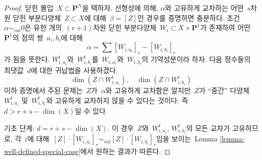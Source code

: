 \begin{proof}
닫힌 몰입\  $X \subset \mathbf{P}^N$을 택하자.
선형성에 의해, $\alpha$와 고유하게 교차하는 어떤\ 
$s$차원 닫힌 부분다양체\  $Z \subset X$에 대해\ 
$\beta = [Z]$인 경우를 증명하면 충분하다.
조건\  $\alpha \sim_{rat} 0$은 유한 개의\  $(r + 1)$차원 닫힌 부분다양체\ 
$W_i \subset X \times \mathbf{P}^1$가 존재하여
어떤\  $\mathbf{P}^1$의 점의 쌍\  $a_i, b_i$에 대해
$$
\alpha = \sum [W_{i, a_i}]_r - [W_{i, b_i}]_r
$$
가 됨을 뜻한다. $W_{i, a_i}^t$와\  $W_{i, b_i}^t$를\ 
$W_{i, a_i}$와\  $W_{i, b_i}$의 기약성분이라 하자.
다음 정수들의 최댓값\  $d$에 대한 귀납법을 사용하겠다.
$$
\dim(Z \cap W_{i, a_i}^t),\quad \dim(Z \cap W_{i, b_i}^t)
$$
이하 증명에서 주된 문제는\  $Z$가\  $\alpha$와 고유하게 교차함은 알지만\ 
$Z$가 “중간” 다양체\  $W_{i, a_i}^t$ 및\ 
$W_{i, b_i}^t$와 고유하게 교차하지 않을 수 있다는 것이다. 즉\ 
$d >  r + s - \dim(X)$일 수 있다.

\medskip\noindent
기초 단계: $d = r + s - \dim(X)$.
이 경우\  $Z$와\  $W_{i, a_i}^t$, $W_{i, b_i}^t$의 모든 교차가
고유하므로, 각\  $i$에 대해\ 
$[Z] \cdot [W_{i, a_i}]_r \sim_{rat} [Z] \cdot [W_{i, b_i}]_r$임을
보이는\  Lemma \ref{lemma-well-defined-special-case}에서 원하는 결과가
따른다.


\end{proof}
